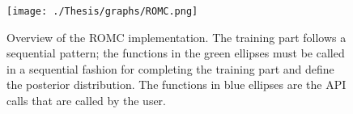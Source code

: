 \begin{figure}[!ht]
    \begin{center}
      \texttt{[image: ./Thesis/graphs/ROMC.png]}
    \end{center}
    \caption{Overview of the ROMC implementation. The training part follows a sequential pattern; the functions in the green ellipses must be called in a sequential fashion for completing the training part and define the posterior distribution. The functions in blue ellipses are the API calls that are called by the user.}
    \label{fig:elfi-model}
\end{figure}